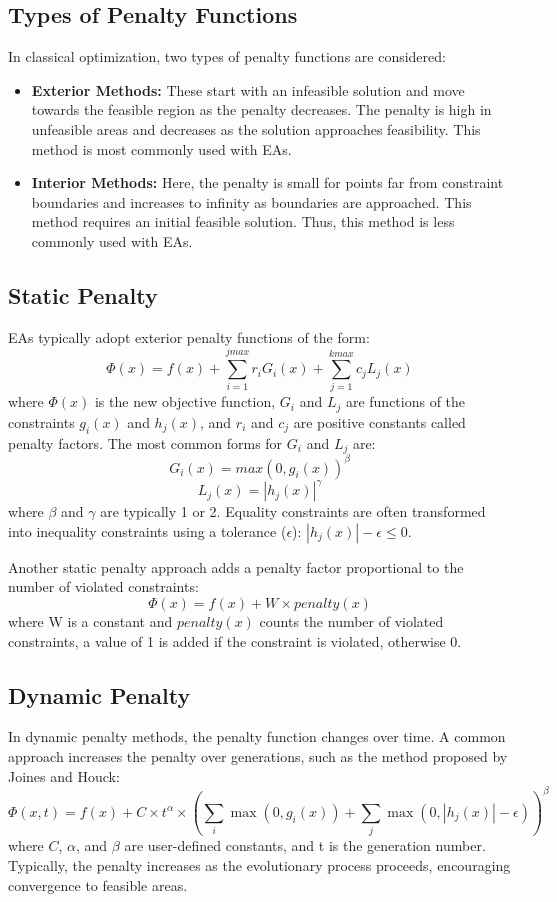 \subsection*{Types of Penalty Functions}

In classical optimization, two types of penalty functions are considered:

\begin{itemize}
    \item \textbf{Exterior Methods:}  These start with an infeasible solution and move towards the feasible region as the penalty decreases.  The penalty is high in unfeasible areas and decreases as the solution approaches feasibility. This method is most commonly used with EAs.
    \item  \textbf{Interior Methods:} Here, the penalty is small for points far from constraint boundaries and increases to infinity as boundaries are approached. This method requires an initial feasible solution. Thus, this method is less commonly used with EAs.
\end{itemize}

\subsection*{Static Penalty}
EAs typically adopt exterior penalty functions of the form:
\[\Phi(x) = f(x) + \sum_{i=1}^{jmax} r_i G_i(x) + \sum_{j=1}^{kmax} c_j L_j(x)\]
where \(\Phi(x)\) is the new objective function, \(G_i\) and \(L_j\) are functions of the constraints \(g_i(x)\) and \(h_j(x)\), and \(r_i\) and \(c_j\) are positive constants called penalty factors. The most common forms for \(G_i\) and \(L_j\) are:
\[G_i(x) = max(0, g_i(x))^{\beta}\]
\[L_j(x) = |h_j(x)|^{\gamma}\]
where \(\beta\) and \(\gamma\) are typically 1 or 2.  Equality constraints are often transformed into inequality constraints using a tolerance (\(\epsilon\)): \( |h_j(x)| - \epsilon \leq 0\).

Another static penalty approach adds a penalty factor proportional to the number of violated constraints:
\[\Phi(x) = f(x) + W \times penalty(x)\]
where W is a constant and \(penalty(x)\) counts the number of violated constraints, a value of 1 is added if the constraint is violated, otherwise 0.

\subsection*{Dynamic Penalty}

In dynamic penalty methods, the penalty function changes over time. A common approach increases the penalty over generations, such as the method proposed by Joines and Houck:
\[\Phi(x,t) = f(x) + C \times t^{\alpha} \times \left(\sum_i \max(0, g_i(x)) + \sum_j  \max(0, |h_j(x)|-\epsilon) \right)^{\beta} \]
where \(C\), \(\alpha\), and \(\beta\) are user-defined constants, and t is the generation number. Typically, the penalty increases as the evolutionary process proceeds, encouraging convergence to feasible areas.

